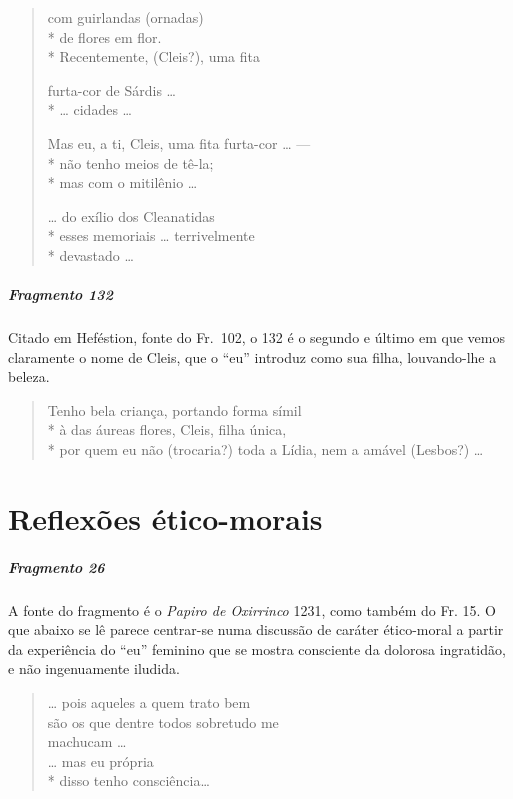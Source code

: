 {\begin{verse}
com guirlandas (ornadas)\\*
de flores em flor.\\*
Recentemente, (Cleis?), uma fita

furta-cor de Sárdis \ldots{}\\*
\ldots{} cidades \ldots{}

Mas eu, a ti, Cleis, uma fita furta-cor \ldots{} ---\\*
não tenho meios de tê-la; \\*
mas com o mitilênio \ldots{}


\ldots{} do exílio dos Cleanatidas\\*
esses memoriais \ldots{} terrivelmente\\*
devastado \ldots{}
\end{verse}

\paragraph{Fragmento 132}

{\small Citado em Heféstion, fonte do Fr.~102, o 132 é o segundo e último em que vemos
claramente o nome de Cleis, que o “eu” introduz como sua filha, louvando-lhe a
beleza.}

\begin{verse}
Tenho bela criança, portando forma símil\\*
à das áureas flores, Cleis, filha única,\\*
por quem eu não (trocaria?) toda a Lídia, nem a \qb{}amável (Lesbos?) \ldots{}
\end{verse}


\chapter{Reflexões ético-morais}


\paragraph{Fragmento 26}

{\small A fonte do fragmento é o \textit{Papiro de Oxirrinco} 1231, como também do Fr.
15. O que abaixo se lê parece centrar-se numa discussão de caráter ético-moral
a partir da experiência do “eu” feminino que se mostra consciente da dolorosa
ingratidão, e não ingenuamente iludida.}

\begin{verse}
\ldots{} pois aqueles a quem trato bem\\
são os que dentre todos sobretudo me\\
machucam \ldots{}\\
\ldots{} mas eu própria\\*
disso tenho consciência\ldots{}
\end{verse}

}
